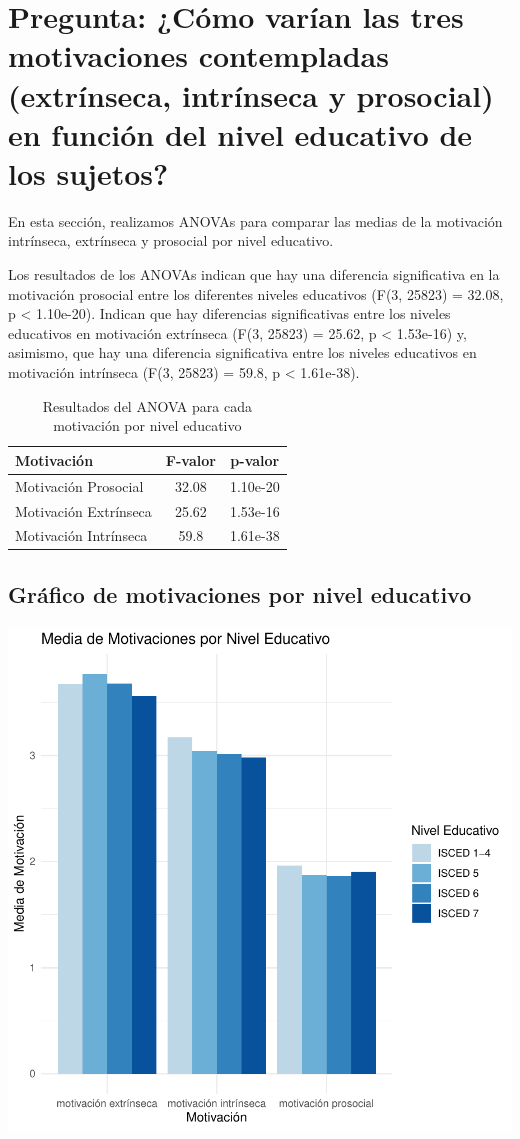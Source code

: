 \documentclass{article}
\begin{document}
\section{Pregunta: ¿Cómo varían las tres motivaciones contempladas (extrínseca, intrínseca y prosocial) en función del nivel educativo de los sujetos?}

En esta sección, realizamos ANOVAs para comparar las medias de la motivación intrínseca, extrínseca y prosocial por nivel educativo.


Los resultados de los ANOVAs indican que hay una diferencia significativa en la motivación prosocial entre los diferentes niveles educativos (F(3, 25823) = 32.08, p < 1.10e-20). Indican que hay diferencias significativas entre los niveles educativos en motivación extrínseca (F(3, 25823) = 25.62, p < 1.53e-16) y, asimismo, que hay una diferencia significativa entre los niveles educativos en motivación intrínseca (F(3, 25823) = 59.8, p < 1.61e-38).

\begin{table}[h!]
\centering
\caption{Resultados del ANOVA para cada motivación por nivel educativo}
\begin{tabular}{lcc}
  \toprule
  \textbf{Motivación} & \textbf{F-valor} & \textbf{p-valor} \\
  \midrule
  Motivación Prosocial & 32.08 & 1.10e-20 \\
  Motivación Extrínseca & 25.62 & 1.53e-16 \\
  Motivación Intrínseca & 59.8 & 1.61e-38 \\
  \bottomrule
\end{tabular}
\end{table}

\subsection{Gráfico de motivaciones por nivel educativo}
\includegraphics{Ejemplo-008}
\end{document}
